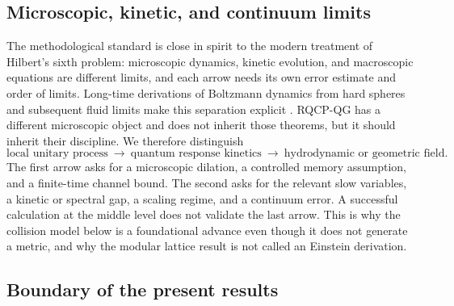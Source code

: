 \subsection{Microscopic, kinetic, and continuum limits}

The methodological standard is close in spirit to the modern treatment of
Hilbert's sixth problem: microscopic dynamics, kinetic evolution, and
macroscopic equations are different limits, and each arrow needs its own
error estimate and order of limits.  Long-time derivations of Boltzmann
dynamics from hard spheres and subsequent fluid limits make this separation
explicit \cite{DengHaniMa2024,DengHaniMa2025}.  RQCP-QG has a different
microscopic object and does not inherit those theorems, but it should inherit
their discipline.  We therefore distinguish
\begin{equation}
 \text{local unitary process}
 \ \longrightarrow\
 \text{quantum response kinetics}
 \ \longrightarrow\
 \text{hydrodynamic or geometric field}.
 \label{eq:three-scale-standard}
\end{equation}
The first arrow asks for a microscopic dilation, a controlled memory
assumption, and a finite-time channel bound.  The second asks for the relevant
slow variables, a kinetic or spectral gap, a scaling regime, and a continuum
error.  A successful calculation at the middle level does not validate the
last arrow.  This is why the collision model below is a foundational advance
even though it does not generate a metric, and why the modular lattice result
is not called an Einstein derivation.

\subsection{Boundary of the present results}

